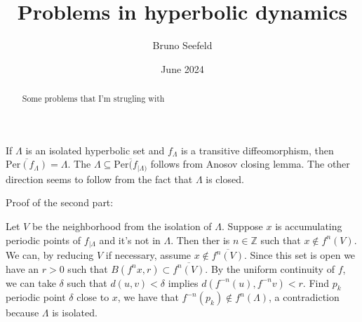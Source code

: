 \documentclass{article}
\title{Problems in hyperbolic dynamics}
\author{Bruno Seefeld}
\date{June 2024}
\begin{document}
\maketitle

\begin{abstract}
Some problems that I'm strugling with

\end{abstract}

\section{}
If $\Lambda$ is an isolated hyperbolic set and $f_\Lambda $ is a transitive diffeomorphism, then $\overline{\text{Per}(f_\Lambda)}=\Lambda$. 
The $\Lambda\subseteq \overline{\text{Per}(f_{|\Lambda)}} $ follows from Anosov closing lemma. The other direction seems to follow from the fact that $\Lambda$ is closed.



Proof of the second part: 

Let $V$ be the neighborhood from the isolation of $\Lambda$. Suppose $x$ is 
accumulating periodic points of $f_{|\Lambda}$ and it's not in $\Lambda$. 
Then ther is $n\in \mathbb{Z}$ such that $x\notin f^n (V)$. We can, by 
reducing $V$ if necessary, assume $x\notin \overline{f^n(V)}$. Since this
set is open we have an $r>0$ such that $B(f^{n}x,r)\subset \overline{f^n(V)} $.
By the uniform continuity of $f$, we can take $\delta$ such that $d(u,v)<\delta$
implies $d(f^{-n}(u), f^{-n}v)<r$. Find $p_k$ periodic point $\delta$ close to 
$x$, we have that $f^{-n}(p_k)\notin f^{n}(\Lambda)$, a contradiction because
$\Lambda$ is isolated.
\end{document}
